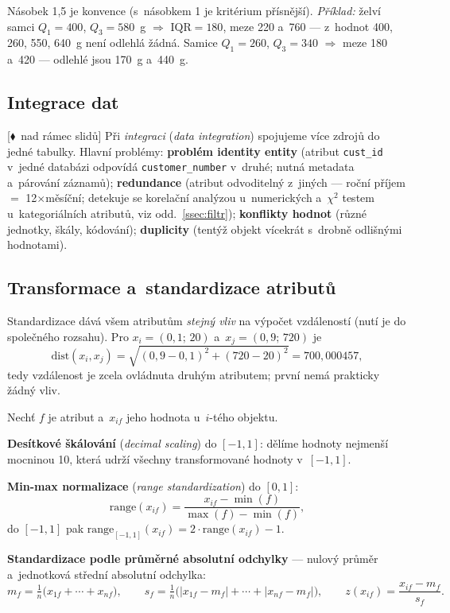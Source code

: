 \documentclass[11pt,a4paper]{article}
\theoremstyle{definition}
\newcommand{\mimo}{\textcolor{markcol}{\textsf{\footnotesize[$\blacklozenge$~nad rámec slidů]}}}
\begin{document}
Násobek 1,5 je konvence (s~násobkem 1 je kritérium přísnější). \emph{Příklad:} želví samci
$Q_1=400$, $Q_3=580$~g $\Rightarrow$ $\mathrm{IQR}=180$, meze 220 a~760 --- z~hodnot 400,
260, 550, 640~g není odlehlá žádná. Samice $Q_1=260$, $Q_3=340$ $\Rightarrow$ meze 180
a~420 --- odlehlé jsou 170~g a~440~g.

\subsection{Integrace dat}
\label{ssec:integrace}

\mimo{} Při \emph{integraci} (\emph{data integration}) spojujeme více zdrojů do jedné
tabulky. Hlavní problémy: \textbf{problém identity entity} (atribut \texttt{cust\_id}
v~jedné databázi odpovídá \texttt{customer\_number} v~druhé; nutná metadata a~párování
záznamů); \textbf{redundance} (atribut odvoditelný z~jiných --- roční příjem $=$
12$\times$měsíční; detekuje se korelační analýzou u~numerických a~$\chi^2$ testem
u~kategoriálních atributů, viz odd.~\ref{ssec:filtr}); \textbf{konflikty hodnot} (různé
jednotky, škály, kódování); \textbf{duplicity} (tentýž objekt vícekrát s~drobně odlišnými
hodnotami).

\subsection{Transformace a~standardizace atributů}

Standardizace dává všem atributům \emph{stejný vliv} na výpočet vzdáleností (nutí je do
společného rozsahu). Pro $x_i=(0{,}1;\,20)$ a~$x_j=(0{,}9;\,720)$ je
\[ \mathrm{dist}(x_i,x_j)=\sqrt{(0{,}9-0{,}1)^2+(720-20)^2}=700{,}000457, \]
tedy vzdálenost je zcela ovládnuta druhým atributem; první nemá prakticky žádný vliv.

\begin{defbox}
Nechť $f$ je atribut a~$x_{if}$ jeho hodnota u~$i$-tého objektu.

\textbf{Desítkové škálování} (\emph{decimal scaling}) do $[-1,1]$: dělíme hodnoty nejmenší
mocninou 10, která udrží všechny transformované hodnoty v~$[-1,1]$.

\textbf{Min-max normalizace} (\emph{range standardization}) do $[0,1]$:
\[ \mathrm{range}(x_{if})=\frac{x_{if}-\min(f)}{\max(f)-\min(f)}, \]
do $[-1,1]$ pak $\mathrm{range}_{[-1,1]}(x_{if})=2\cdot \mathrm{range}(x_{if})-1$.

\textbf{Standardizace podle průměrné absolutní odchylky} --- nulový průměr a~jednotková
střední absolutní odchylka:
\[ m_f=\tfrac1n\big(x_{1f}+\cdots+x_{nf}\big),\qquad
s_f=\tfrac1n\big(|x_{1f}-m_f|+\cdots+|x_{nf}-m_f|\big),\qquad
z(x_{if})=\frac{x_{if}-m_f}{s_f}. \]
\end{defbox}
\end{document}
